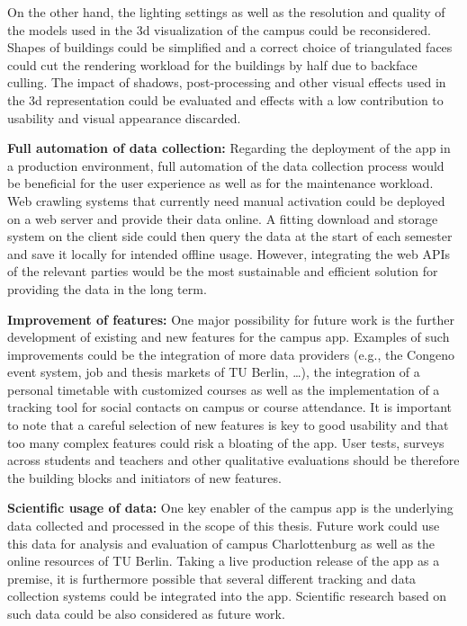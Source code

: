 On the other hand, the lighting settings as well as the resolution and quality of the models used in the 3d visualization of the campus could be reconsidered. Shapes of buildings could be simplified and a correct choice of triangulated faces could cut the rendering workload for the buildings by half due to backface culling. The impact of shadows, post-processing and other visual effects used in the 3d representation could be evaluated and effects with a low contribution to usability and visual appearance discarded.

\textbf{Full automation of data collection:} Regarding the deployment of the app in a production environment, full automation of the data collection process would be beneficial for the user experience as well as for the maintenance workload. Web crawling systems that currently need manual activation could be deployed on a web server and provide their data online. A fitting download and storage system on the client side could then query the data at the start of each semester and save it locally for intended offline usage. However, integrating the web APIs of the relevant parties would be the most sustainable and efficient solution for providing the data in the long term.

\textbf{Improvement of features:} One major possibility for future work is the further development of existing and new features for the campus app. Examples of such improvements could be the integration of more data providers (e.g., the Congeno event system, job and thesis markets of TU Berlin, \ldots), the integration of a personal timetable with customized courses as well as the implementation of a tracking tool for social contacts on campus or course attendance. It is important to note that a careful selection of new features is key to good usability and that too many complex features could risk a bloating of the app. User tests, surveys across students and teachers and other qualitative evaluations should be therefore the building blocks and initiators of new features. 

\textbf{Scientific usage of data:} One key enabler of the campus app is the underlying data collected and processed in the scope of this thesis. Future work could use this data for analysis and evaluation of campus Charlottenburg as well as the online resources of TU Berlin. Taking a live production release of the app as a premise, it is furthermore possible that several different tracking and data collection systems could be integrated into the app. Scientific research based on such data could be also considered as future work.

